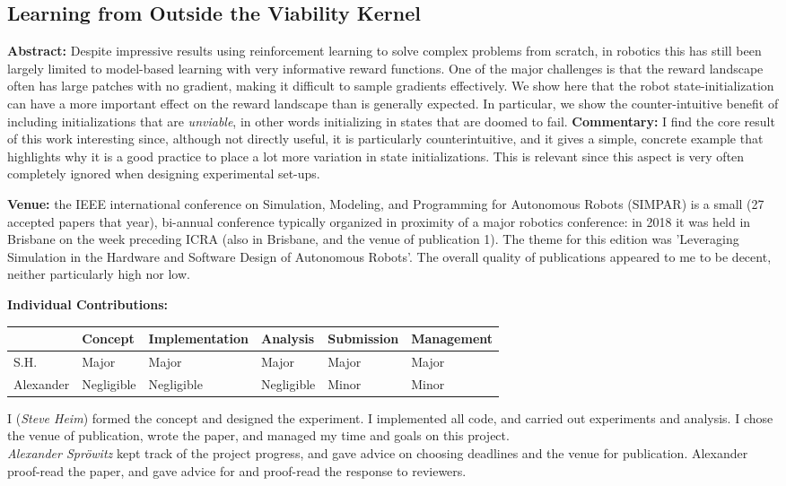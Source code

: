 \subsection{Learning from Outside the Viability Kernel}
\textbf{Abstract: }
Despite impressive results using reinforcement learning to solve complex problems from scratch, in robotics this has still been largely limited to model-based learning with very informative reward functions. One of the major challenges is that the reward landscape often has large patches with no gradient, making it difficult to sample gradients effectively. We show here that the robot state-initialization can have a more important effect on the reward landscape than is generally expected. In particular, we show the counter-intuitive benefit of including initializations that are \emph{unviable}, in other words initializing in states that are doomed to fail.
\textbf{Commentary: }
I find the core result of this work interesting since, although not directly useful, it is particularly counterintuitive, and it gives a simple, concrete example that highlights why it is a good practice to place a lot more variation in state initializations. This is relevant since this aspect is very often completely ignored when designing experimental set-ups.
\par
\textbf{Venue: }
the IEEE international conference on Simulation, Modeling, and Programming for Autonomous Robots (SIMPAR) is a small (27 accepted papers that year), bi-annual conference typically organized in proximity of a major robotics conference: in 2018 it was held in Brisbane on the week preceding ICRA (also in Brisbane, and the venue of publication 1). The theme for this edition was 'Leveraging Simulation in the Hardware and Software Design of Autonomous Robots'. The overall quality of publications appeared to me to be decent, neither particularly high nor low.
\par
\textbf{Individual Contributions: }
\begin{table}[H]
\begin{tabular}{l|l|l|l|l|l|}
\cline{2-6}
 \textbf{} & \textbf{Concept} & {\footnotesize \textbf{Implementation}} & \textbf{Analysis} & \textbf{Submission} & {\footnotesize \textbf{Management}} \\ \hline
\multicolumn{1}{|l|}{S.H.} & Major & Major & Major & Major & Major \\ \hline
\multicolumn{1}{|l|}{Alexander} & Negligible & Negligible & Negligible & Minor & Minor \\ \hline
\end{tabular}
\end{table}
I (\emph{Steve Heim}) formed the concept and designed the experiment. I implemented all code, and carried out experiments and analysis. I chose the venue of publication, wrote the paper, and managed my time and goals on this project. \\
\emph{Alexander Spr\"{o}witz} kept track of the project progress, and gave advice on choosing deadlines and the venue for publication. Alexander proof-read the paper, and gave advice for and proof-read the response to reviewers.